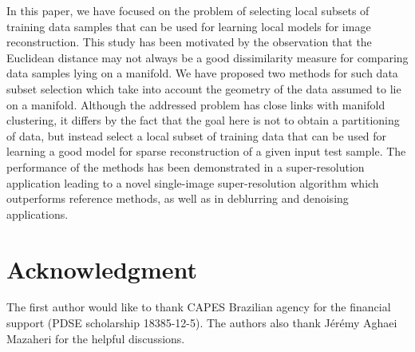 \documentclass[journal]{IEEEtran}
\begin{document}
In this paper, we have focused on the problem of selecting local subsets of training data samples that can be used for learning local models for image reconstruction. This study has been motivated by the observation that the Euclidean distance may not always be a good dissimilarity measure for comparing data samples lying on a manifold. We have proposed two methods for such data subset selection which take into account the geometry of the data assumed to lie on a manifold.  Although the addressed problem has close links with manifold clustering, it differs by the fact that the goal here is not to obtain a partitioning of data, but instead select a local subset of training data that can be used for learning a good model for sparse reconstruction of a given input test sample. 
The performance of the methods has been demonstrated in a super-resolution application leading to a novel single-image super-resolution algorithm which outperforms reference methods, as well as in deblurring and denoising applications.








\section*{Acknowledgment}
The first author would like to thank CAPES Brazilian agency for the financial support (PDSE scholarship 18385-12-5). The authors also thank J\'er\'emy Aghaei Mazaheri for the helpful discussions.


\ifCLASSOPTIONcaptionsoff
  \newpage
\fi









\end{document}
